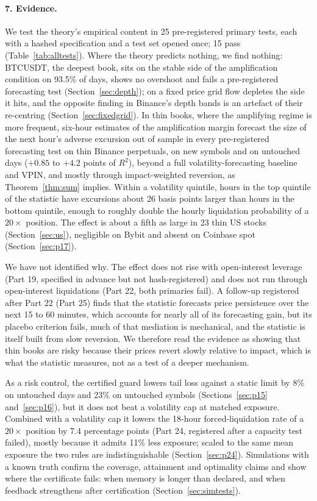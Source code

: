\documentclass[12pt]{article}
\theoremstyle{definition}
\theoremstyle{remark}
\begin{document}
\paragraph{7. Evidence.} We test the theory's empirical content in 25 pre-registered primary tests, each with a hashed specification and a test set opened once; 15 pass (Table~\ref{tab:alltests}). Where the theory predicts nothing, we find nothing: BTCUSDT, the deepest book, sits on the stable side of the amplification condition on 93.5\% of days, shows no overshoot and fails a pre-registered forecasting test (Section~\ref{sec:depth}); on a fixed price grid flow depletes the side it hits, and the opposite finding in Binance's depth bands is an artefact of their re-centring (Section~\ref{sec:fixedgrid}). In thin books, where the amplifying regime is more frequent, six-hour estimates of the amplification margin forecast the size of the next hour's adverse excursion out of sample in every pre-registered forecasting test on thin Binance perpetuals, on new symbols and on untouched days ($+0.85$ to $+4.2$ points of $R^2$), beyond a full volatility-forecasting baseline and VPIN, and mostly through impact-weighted reversion, as Theorem~\ref{thm:sum} implies. Within a volatility quintile, hours in the top quintile of the statistic have excursions about 26 basis points larger than hours in the bottom quintile, enough to roughly double the hourly liquidation probability of a $20\times$ position. The effect is about a fifth as large in 23 thin US stocks (Section~\ref{sec:us}), negligible on Bybit and absent on Coinbase spot (Section~\ref{sec:p17}).

We have not identified why. The effect does not rise with open-interest leverage (Part 19, specified in advance but not hash-registered) and does not run through open-interest liquidations (Part 22, both primaries fail). A follow-up registered after Part 22 (Part 25) finds that the statistic forecasts price persistence over the next 15 to 60 minutes, which accounts for nearly all of its forecasting gain, but its placebo criterion fails, much of that mediation is mechanical, and the statistic is itself built from slow reversion. We therefore read the evidence as showing that thin books are risky because their prices revert slowly relative to impact, which is what the statistic measures, not as a test of a deeper mechanism.

As a risk control, the certified guard lowers tail loss against a static limit by 8\% on untouched days and 23\% on untouched symbols (Sections~\ref{sec:p15} and~\ref{sec:p16}), but it does not beat a volatility cap at matched exposure. Combined with a volatility cap it lowers the 18-hour forced-liquidation rate of a $20\times$ position by 7.4 percentage points (Part 24, registered after a capacity test failed), mostly because it admits 11\% less exposure; scaled to the same mean exposure the two rules are indistinguishable (Section~\ref{sec:p24}). Simulations with a known truth confirm the coverage, attainment and optimality claims and show where the certificate fails: when memory is longer than declared, and when feedback strengthens after certification (Section~\ref{sec:simtests}).
\end{document}
